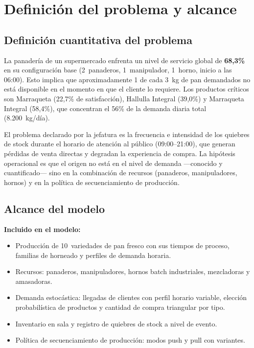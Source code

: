 \documentclass[12pt]{article}
\begin{document}
\newpage
\section{Definición del problema y alcance}
\label{sec:definicion}

\subsection{Definición cuantitativa del problema}

La panadería de un supermercado enfrenta un nivel de servicio global de \textbf{68,3\%} en su configuración base (2~panaderos, 1~manipulador, 1~horno, inicio a las 06:00). Esto implica que aproximadamente 1 de cada 3~kg de pan demandados no está disponible en el momento en que el cliente lo requiere. Los productos críticos son Marraqueta (22,7\% de satisfacción), Hallulla Integral (39,0\%) y Marraqueta Integral (58,4\%), que concentran el 56\% de la demanda diaria total (8.200~kg/día).

El problema declarado por la jefatura es la frecuencia e intensidad de los quiebres de stock durante el horario de atención al público (09:00--21:00), que generan pérdidas de venta directas y degradan la experiencia de compra. La hipótesis operacional es que el origen no está en el nivel de demanda ---conocido y cuantificado--- sino en la combinación de recursos (panaderos, manipuladores, hornos) y en la política de secuenciamiento de producción.

\subsection{Alcance del modelo}

\textbf{Incluido en el modelo:}
\begin{itemize}
  \item Producción de 10~variedades de pan fresco con sus tiempos de proceso, familias de horneado y perfiles de demanda horaria.
  \item Recursos: panaderos, manipuladores, hornos batch industriales, mezcladoras y amasadoras.
  \item Demanda estocástica: llegadas de clientes con perfil horario variable, elección probabilística de productos y cantidad de compra triangular por tipo.
  \item Inventario en sala y registro de quiebres de stock a nivel de evento.
  \item Política de secuenciamiento de producción: modos push y pull con variantes.
\end{itemize}
\end{document}
